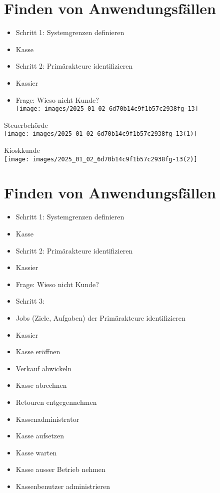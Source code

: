 \documentclass[10pt]{article}
\begin{document}
\section*{Finden von Anwendungsfällen}
\begin{itemize}
  \item Schritt 1: Systemgrenzen definieren
  \item Kasse
  \item Schritt 2: Primärakteure identifizieren
  \item Kassier
  \item Frage: Wieso nicht Kunde?\\
\texttt{[image: images/2025\_01\_02\_6d70b14c9f1b57c2938fg-13]}
\end{itemize}

Steuerbehörde\\
\texttt{[image: images/2025\_01\_02\_6d70b14c9f1b57c2938fg-13(1)]}

Kioskkunde\\
\texttt{[image: images/2025\_01\_02\_6d70b14c9f1b57c2938fg-13(2)]}

\section*{Finden von Anwendungsfällen}
\begin{itemize}
  \item Schritt 1: Systemgrenzen definieren
  \item Kasse
  \item Schritt 2: Primärakteure identifizieren
  \item Kassier
  \item Frage: Wieso nicht Kunde?
  \item Schritt 3:
  \item Jobs (Ziele, Aufgaben) der Primärakteure identifizieren
  \item Kassier
  \item Kasse eröffnen
  \item Verkauf abwickeln
  \item Kasse abrechnen
  \item Retouren entgegennehmen
  \item Kassenadministrator
  \item Kasse aufsetzen
  \item Kasse warten
  \item Kasse ausser Betrieb nehmen
  \item Kassenbenutzer administrieren
\end{itemize}
\end{document}
